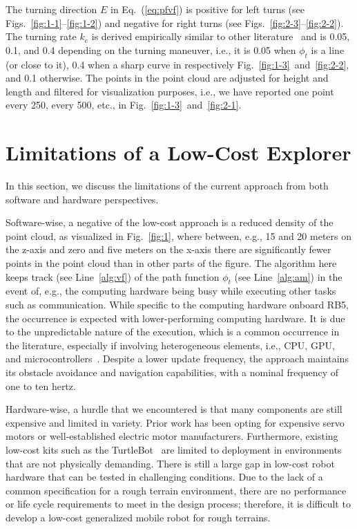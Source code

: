 \documentclass[letterpaper,10pt,conference,twoside]{IEEEtran}
\theoremstyle{definition}
\begin{document}
The turning direction $E$ in Eq.~(\ref{eq:pfvf}) is positive for left turns (see Figs.~\ref{fig:1-1}--\ref{fig:1-2}) and negative for right turns (see Figs.~\ref{fig:2-3}--\ref{fig:2-2}). The turning rate $k_e$ is derived empirically similar to other literature~\cite{seewald2022energy,garcia2017guidance} and is 0.05, 0.1, and 0.4 depending on the turning maneuver, i.e., it is 0.05 when $\phi_t$ is a line (or close to it), 0.4 when a sharp curve in respectively Fig.~\ref{fig:1-3}~and~\ref{fig:2-2}, and 0.1 otherwise.  
The points in the point cloud are adjusted for height and length and filtered for visualization purposes, i.e., we have reported one point every 250, every 500, etc., in Fig.~\ref{fig:1-3}~and~\ref{fig:2-1}.


\section{Limitations of a Low-Cost Explorer}\label{sec:lim}
\noindent
In this section, we discuss 
the limitations of the current approach from both software and hardware perspectives.

Software-wise, a negative of the low-cost approach is a reduced density of the point cloud, as visualized in Fig.~\ref{fig:1}, where between, e.g., 15 and 20 meters on the z-axis and zero and five meters on the x-axis there are significantly fewer points in the point cloud than in other parts of the figure. 
The algorithm here keeps track (see Line~\ref{alg:vf}) of the path function $\phi_t$ (see Line~\ref{alg:am}) in the event of, e.g., the computing hardware being busy while executing other tasks such as communication. While specific to the computing hardware onboard RB5, the occurrence is expected with lower-performing computing hardware. It is due to the unpredictable nature of the execution, which is a common occurrence in the literature, especially if involving heterogeneous elements, i.e., CPU, GPU, and microcontrollers~\cite{seewald2019coarse}.
Despite a lower update frequency, the approach maintains its obstacle avoidance and navigation capabilities, with a nominal frequency of one to ten hertz.

Hardware-wise, a hurdle that we encountered %
is that many components are still %
expensive and limited in variety. Prior work has been %
opting for expensive servo motors or well-established electric motor manufacturers.
%
Furthermore, existing low-cost %
kits such as the TurtleBot~\cite{amster2020turtlebot} are limited to deployment in %
environments that are not physically demanding. There is still a large gap in low-cost robot hardware that can be tested in challenging conditions. Due to the lack of a common specification %
for a rough terrain environment, there are no performance or life cycle requirements to meet in the %
design process; therefore, it is difficult to develop a low-cost generalized mobile robot for rough terrains.
\end{document}
